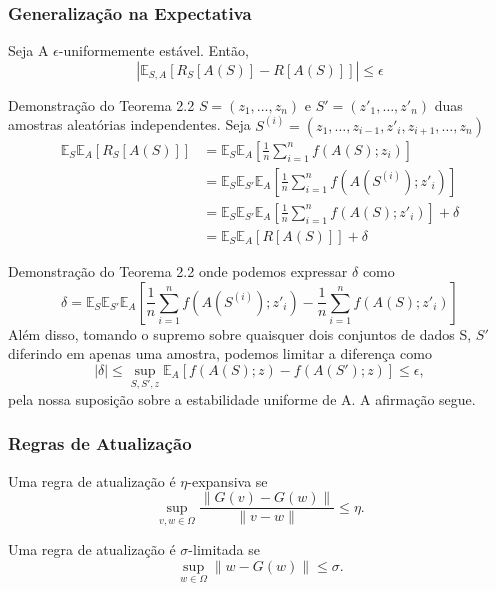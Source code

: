 \documentclass{beamer}
\newcommand{\EE}{\mathbb{E}}
\begin{document}
\begin{frame}
\frametitle{Generalização na Expectativa}
\begin{theorem}[2.2] Seja A \(\epsilon\)-uniformemente estável. Então,
$$ |\EE_{S,A}[R_{S}[A(S)] - R[A(S)]]| \le \epsilon $$ 
\end{theorem}
\end{frame}

\begin{frame}{Demonstração do Teorema 2.2} 
\(S=(z_{1},\ldots,z_{n})\) e \(S'=(z'_{1},\ldots,z'_{n})\) duas amostras aleatórias independentes. 
Seja \(S^{(i)}=(z_{1},\ldots,z_{i-1},z'_{i},z_{i+1},\ldots,z_{n})\)  
\begin{align*}
\EE_{S}\EE_{A}[R_{S}[A(S)]] &= \EE_{S}\EE_{A}[\frac{1}{n}\sum_{i=1}^{n}f(A(S);z_{i})] \\
&= \EE_{S}\EE_{S'}\EE_{A}[\frac{1}{n}\sum_{i=1}^{n}f(A(S^{(i)});z'_{i})] \\
&= \EE_{S}\EE_{S'}\EE_{A}[\frac{1}{n}\sum_{i=1}^{n}f(A(S);z'_{i})] + \delta \\
&= \EE_{S}\EE_{A}[R[A(S)]] + \delta
\end{align*}
\end{frame}

\begin{frame}{Demonstração do Teorema 2.2} 
    onde podemos expressar \(\delta\) como
$$ \delta = \EE_{S}\EE_{S'}\EE_{A}[\frac{1}{n}\sum_{i=1}^{n}f(A(S^{(i)});z'_{i}) - \frac{1}{n}\sum_{i=1}^{n}f(A(S);z'_{i})] $$
Além disso, tomando o supremo sobre quaisquer dois conjuntos de dados S, \(S'\) diferindo em apenas uma amostra, podemos limitar a diferença como
$$ |\delta| \le \sup_{S,S',z}\EE_{A}[f(A(S);z) - f(A(S');z)] \le \epsilon, $$
pela nossa suposição sobre a estabilidade uniforme de A. A afirmação segue.  
\end{frame}

\begin{frame}
\frametitle{Regras de Atualização}
\begin{definition}[2.3]
Uma regra de atualização é \(\eta\)-expansiva se
$$ \sup_{v,w \in \Omega} \frac{\|G(v) - G(w)\|}{\|v - w\|} \le \eta. $$ 
\end{definition}

\begin{definition}[2.4]
Uma regra de atualização é \(\sigma\)-limitada se
$$ \sup_{w \in \Omega} \|w - G(w)\| \le \sigma. $$ 
\end{definition}
\end{frame}
 
\end{document}
